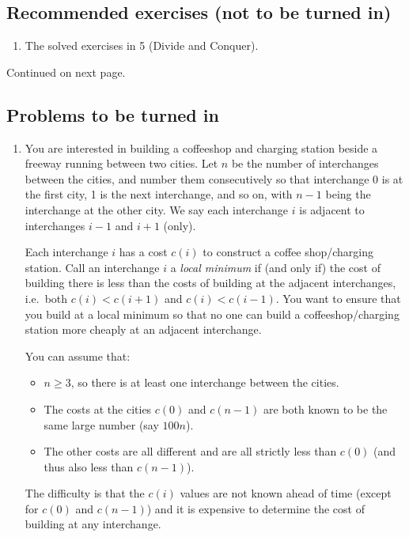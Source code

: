 \documentclass[11pt]{article}
\theoremstyle{definition}
\begin{document}
\subsection*{Recommended exercises (not to be turned in)}
\begin{enumerate}
\item The solved exercises in 5 (Divide and Conquer).
\end{enumerate} 
Continued on next page.
\newpage
\subsection*{Problems to be turned in}
\begin{enumerate}
\item 
You are interested in building a coffeeshop and charging station beside a freeway running between two cities.
Let $n$ be the number of interchanges between the cities, and number them consecutively so that interchange 0 is  at the first  city, 1 is the next interchange, and so on, with $n-1$ being the interchange at the other city.
We say each interchange $i$ is adjacent to  interchanges $i-1$ and $i+1$ (only).

Each interchange $i$ has a cost $c(i)$ to construct a coffee shop/charging station. 
Call an interchange $i$ a \emph{local minimum} if (and only if) the cost of building there is less than the costs of building at
the adjacent interchanges, i.e.~both $c(i) < c(i+1)$ and $c(i) < c(i-1)$.
You want to ensure that you build at a local minimum so that 
no one can build a coffeeshop/charging station more cheaply at an adjacent interchange.  

You can assume that: 
\begin{itemize}
\item $n \geq 3$, so there is at least one interchange between the cities.
\item  The costs at the cities $c(0)$ and $c(n-1)$ are both known to be the same large number (say $100n$).
\item  The other costs are all different and are all strictly less than $c(0)$ (and thus also less than $c(n-1)$).
\end{itemize}
The difficulty is that  the $c(i)$ values are not known ahead of time (except for $c(0)$ and $c(n-1)$) and it is expensive to determine the cost of building at any interchange.  


\end{enumerate}
\end{document}
